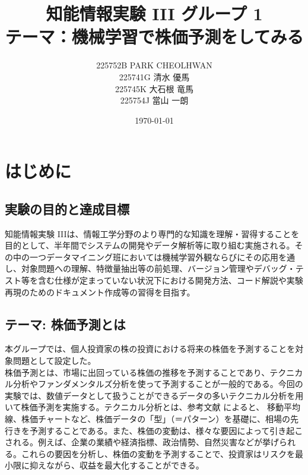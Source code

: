 \documentclass[a4paper, 11pt, titlepage]{jsarticle}
\title{知能情報実験 I\hspace{-1.2pt}I\hspace{-1.2pt}I グループ 1 \\ テーマ：機械学習で株価予測をしてみる}
\author{225752B PARK CHEOLHWAN \\ 225741G 清水 優馬 \\ 225745K 大石根 竜馬 \\ 225754J 當山 一朗}
\date{\today}
\begin{document}
\maketitle
\tableofcontents
\clearpage

\section{はじめに}
\subsection{実験の目的と達成目標}
\indent 知能情報実験 I\hspace{-1.2pt}I\hspace{-1.2pt}Iは、情報工学分野のより専門的な知識を理解・習得することを目的として、半年間でシステムの開発やデータ解析等に取り組む実施される。その中の一つデータマイニング班においては機械学習外観ならびにその応用を通し、対象問題への理解、特徴量抽出等の前処理、バージョン管理やデバッグ・テスト等を含む仕様が定まっていない状況下における開発方法、コード解説や実験再現のためのドキュメント作成等の習得を目指す。
\subsection{テーマ: 株価予測とは}
\indent 本グループでは、個人投資家の株の投資における将来の株価を予測することを対象問題として設定した。\\
\indent 株価予測とは、市場に出回っている株価の推移を予測することであり、テクニカル分析やファンダメンタルズ分析を使って予測することが一般的である。今回の実験では、数値データとして扱うことができるデータの多いテクニカル分析を用いて株価予測を実施する。テクニカル分析とは、参考文献 \cite{tech}によると、 移動平均線、株価チャートなど、株価データの「型」（＝パターン）を基礎に、相場の先行きを予測することである。また、株価の変動は、様々な要因によって引き起こされる。例えば、企業の業績や経済指標、政治情勢、自然災害などが挙げられる。これらの要因を分析し、株価の変動を予測することで、投資家はリスクを最小限に抑えながら、収益を最大化することができる。\\
\end{document}
